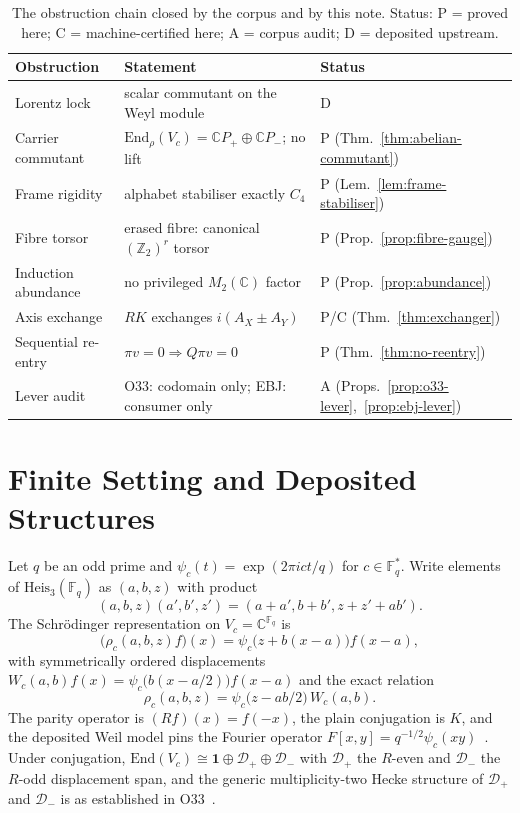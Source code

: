 \documentclass[11pt,a4paper]{article}
\theoremstyle{definition}
\theoremstyle{remark}
\newcommand{\C}{\mathbb{C}}
\newcommand{\Fq}{\mathbb{F}_q}
\newcommand{\Heis}{\mathrm{Heis}_3(\Fq)}
\newcommand{\End}{\mathrm{End}}
\newcommand{\Id}{\mathbf{1}}
\newcommand{\Dplus}{\mathcal{D}_{+}}
\newcommand{\Dminus}{\mathcal{D}_{-}}
\newcommand{\Vc}{V_{c}}
\newcommand{\AX}{A_{X}}
\newcommand{\AY}{A_{Y}}
\begin{document}
\begin{table}[ht]
  \centering
  \caption{The obstruction chain closed by the corpus and by this note.
  Status: P = proved here; C = machine-certified here; A = corpus audit;
  D = deposited upstream.}
  \label{tab:chain}
  \renewcommand{\arraystretch}{1.25}
  \small
  \begin{tabular}{@{}lll@{}}
    \toprule
    Obstruction & Statement & Status \\
    \midrule
    Lorentz lock & scalar commutant on the Weyl module & D~\cite{Beau2026q14} \\
    Carrier commutant & $\End_\rho(\Vc)=\C P_+\oplus\C P_-$; no lift &
    P (Thm.~\ref{thm:abelian-commutant}) \\
    Frame rigidity & alphabet stabiliser exactly $C_4$ &
    P (Lem.~\ref{lem:frame-stabiliser}) \\
    Fibre torsor & erased fibre: canonical $(\mathbb{Z}_2)^r$ torsor &
    P (Prop.~\ref{prop:fibre-gauge}) \\
    Induction abundance & no privileged $M_2(\C)$ factor &
    P (Prop.~\ref{prop:abundance}) \\
    Axis exchange & $RK$ exchanges $i(\AX\pm\AY)$ &
    P/C (Thm.~\ref{thm:exchanger}) \\
    Sequential re-entry & $\pi v=0\Rightarrow Q\pi v=0$ &
    P (Thm.~\ref{thm:no-reentry}) \\
    Lever audit & O33: codomain only; EBJ: consumer only &
    A (Props.~\ref{prop:o33-lever},~\ref{prop:ebj-lever}) \\
    \bottomrule
  \end{tabular}
\end{table}

\section{Finite Setting and Deposited Structures}
\label{sec:setting}

Let $q$ be an odd prime and $\psi_c(t)=\exp(2\pi ict/q)$ for $c\in\Fq^*$.
Write elements of $\Heis$ as $(a,b,z)$ with product
\begin{equation}
  (a,b,z)(a',b',z')=(a+a',b+b',z+z'+ab').
  \label{eq:heis-product}
\end{equation}
The Schr\"odinger representation on $\Vc=\C^{\Fq}$ is
\begin{equation}
  \bigl(\rho_c(a,b,z)f\bigr)(x)=\psi_c\bigl(z+b(x-a)\bigr)f(x-a),
  \label{eq:schrodinger}
\end{equation}
with symmetrically ordered displacements
$W_c(a,b)f(x)=\psi_c\bigl(b(x-a/2)\bigr)f(x-a)$ and the exact relation
\begin{equation}
  \rho_c(a,b,z)=\psi_c\bigl(z-ab/2\bigr)\,W_c(a,b).
  \label{eq:rho-weyl}
\end{equation}
The parity operator is $(Rf)(x)=f(-x)$, the plain conjugation is $K$, and the deposited
Weil model pins the Fourier operator $F[x,y]=q^{-1/2}\psi_c(xy)$~\cite{Korinman2013,
Beau2026a37}.
Under conjugation, $\End(\Vc)\cong\Id\oplus\Dplus\oplus\Dminus$ with $\Dplus$ the
$R$-even and $\Dminus$ the $R$-odd displacement span, and the generic multiplicity-two
Hecke structure of $\Dplus$ and $\Dminus$ is as established in O33~\cite{Beau2026a37}.
\end{document}
